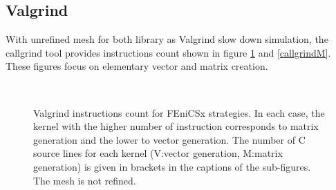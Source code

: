 \documentclass[12pt]{article}
\newcommand{\f}[1]{FEniCSx#1}
\begin{document}
\subsection{Valgrind}
With unrefined mesh for both library as Valgrind slow down simulation, the callgrind tool provides instructions count shown in figure \ref{callgrindF} and \ref{callgrindM}. These figures focus on elementary vector and matrix creation.
\begin{figure}
	\\
	\caption{Valgrind instructions count for \f{} strategies. In each case, the kernel with the higher number of instruction corresponds to matrix generation and the lower to vector generation. The number of C source lines for each kernel (V:vector generation, M:matrix generation) is given in brackets in the captions of the sub-figures. The mesh is not refined.\label{callgrindF}}
\end{figure}
\end{document}
